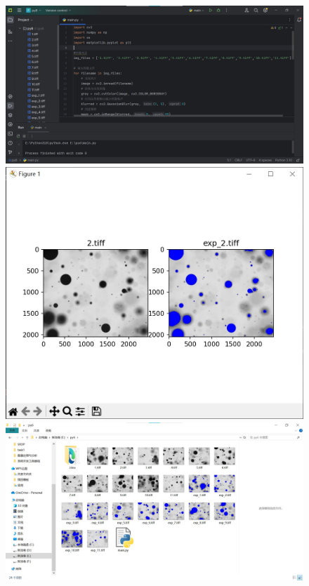 \documentclass[a4paper, 12pt]{article}
\begin{document}
	\begin{figure}[H]
		\centering
		\includegraphics[width=1\textwidth]{039.jpg}
		\includegraphics[width=1\textwidth]{040.jpg}
		\includegraphics[width=1\textwidth]{041.jpg}
	\end{figure}
	
\end{document}

